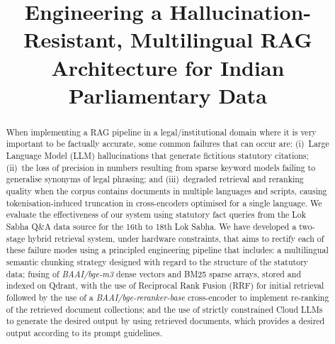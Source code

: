 \documentclass[conference]{IEEEtran}
\begin{document}
\title{Engineering a Hallucination-Resistant, Multilingual RAG Architecture
       for Indian Parliamentary Data}

\author{%
\and
}

\maketitle

\begin{abstract}
When implementing a RAG pipeline in a legal/institutional domain where it is very important to be factually accurate, some common failures that can occur are:
(i)~Large Language Model (LLM) hallucinations that generate fictitious statutory citations;
(ii)~the loss of precision in numbers resulting from sparse keyword models failing to generalise synonyms of legal phrasing; and
(iii)~degraded retrieval and reranking quality when the corpus contains documents in multiple languages and scripts, causing tokenisation-induced truncation in cross-encoders optimised for a single language.
We evaluate the effectiveness of our system using statutory fact queries from the Lok Sabha Q\&A data source for the 16th to 18th Lok Sabha.
We have developed a two-stage hybrid retrieval system, under hardware constraints, that aims to rectify each of these failure modes using a principled engineering pipeline that includes: a multilingual semantic chunking strategy designed with regard to the structure of the statutory data; fusing of \textit{BAAI/bge-m3} dense vectors and BM25 sparse arrays, stored and indexed on Qdrant, with the use of Reciprocal Rank Fusion (RRF) for initial retrieval followed by the use of a \textit{BAAI/bge-reranker-base} cross-encoder to implement re-ranking of the retrieved document collections; and the use of strictly constrained Cloud LLMs to generate the desired output by using retrieved documents, which provides a desired output according to its prompt guidelines.
\end{abstract}
\end{document}

